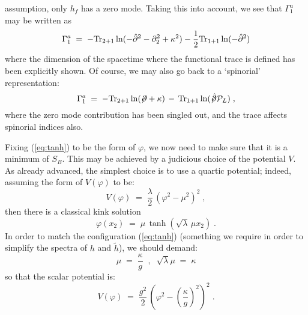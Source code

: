 \documentclass[a4paper,12pt]{article}
\begin{document}
assumption, only $h_f$ has a zero mode.  
Taking this into account, we see that $\Gamma_1^a$ may be written as
\begin{equation}
\Gamma_1^a \;=\; -{\rm Tr}_{2+1}\ln(-{\hat \partial}^2 - \partial_2^2 + \kappa^2) 
- \frac{1}{2} {\rm Tr}_{1+1}\ln(-{\hat\partial}^2) 
\end{equation}
where the dimension of the spacetime where the functional trace is defined has
been explicitly shown. Of course, we may also go back to a `spinorial' 
representation:
\begin{equation}
\Gamma_1^a \;=\; -{\rm Tr}_{2+1}\ln(\not\!\partial + \kappa) \,
-\,{\rm Tr}_{1+1}\ln(\not\!{\hat \partial}{\mathcal P}_L) \;, 
\end{equation}
where the zero mode contribution has been singled out, and the trace 
affects spinorial indices also.    

Fixing (\ref{eq:tanh}) to be the form of $\varphi$, we now need to
make sure that it is a minimum of $S_B$. This may be achieved by a 
judicious choice of the potential $V$. 
As already advanced, the simplest choice is to use a quartic potential; 
indeed, assuming the form of $V(\varphi)$ to be:
\begin{equation}
  \label{eq:vform}
V(\varphi) \;=\; \frac{\lambda}{2} \, (\varphi^2 - \mu^2)^2 \;,
\end{equation}
then there is a classical kink solution
\begin{equation}
  \label{eq:ksol}
\varphi(x_2) \;=\; \mu \, \tanh (\sqrt{\lambda}\, \mu x_2) \;.
\end{equation}
In order to match the configuration (\ref{eq:tanh}) (something we
require in order to simplify the spectra of $h$ and ${\tilde h}$), 
we should demand:
\begin{equation}
  \label{eq:fparm}
\mu \;=\; \frac{\kappa}{g} \;\;,\;\; \sqrt{\lambda} \mu \;=\; \kappa 
\end{equation}
so that the scalar potential is:
\begin{equation}
  \label{eq:vform1}
V(\varphi) \;=\; \frac{g^2}{2} \, \left(\varphi^2 - (\frac{\kappa}{g})^2\right)^2 \;.
\end{equation}
\end{document}
